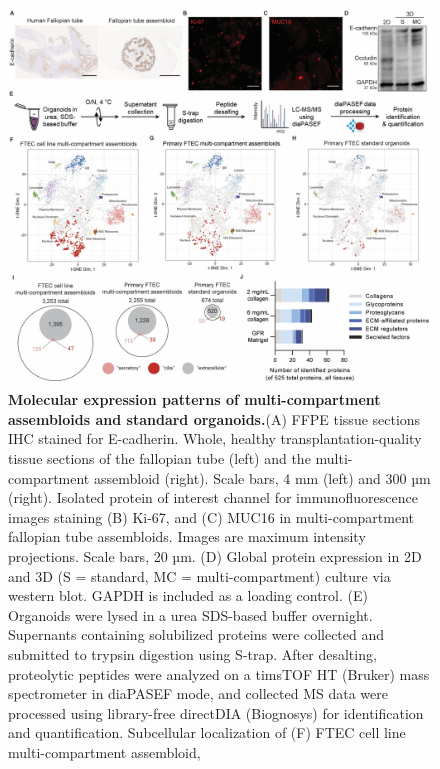 \begin{refsection}
    \begin{figure}[p]
        \begin{center}
            \includegraphics[width=1\textwidth,height=0.85\textheight,keepaspectratio,clip,page=1]{figures/chapter4/fig_S2.jpg}
            \captionsetup{font=small}
            \caption{\textbf{Molecular expression patterns of multi-compartment assembloids and standard organoids.}(A) FFPE tissue sections IHC stained for E-cadherin. Whole, healthy transplantation-quality tissue sections of the fallopian tube (left) and the multi-compartment assembloid (right). Scale bars, 4 mm (left) and 300 µm (right). Isolated protein of interest channel for immunofluorescence images staining (B) Ki-67, and (C) MUC16 in multi-compartment fallopian tube assembloids. Images are maximum intensity projections. Scale bars, 20 µm. (D) Global protein expression in 2D and 3D (S = standard, MC = multi-compartment) culture via western blot. GAPDH is included as a loading control.  (E) Organoids were lysed in a urea SDS-based buffer overnight. Supernants containing solubilized proteins were collected and submitted to trypsin digestion using S-trap. After desalting, proteolytic peptides were analyzed on a timsTOF HT (Bruker) mass spectrometer in diaPASEF mode, and collected MS data were processed using library-free directDIA (Biognosys) for identification and quantification. Subcellular localization of (F) FTEC cell line multi-compartment assembloid, }
            \label{chapter4_figS2}
        \end{center}
    \end{figure}
    

\end{refsection}
